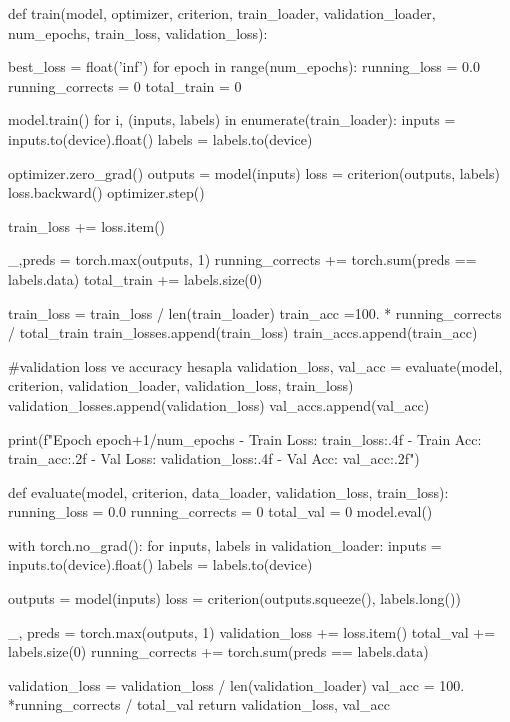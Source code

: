 \documentclass[11pt]{article}
\begin{document}
\begin{python}

def train(model, optimizer, criterion, train_loader, validation_loader, num_epochs, train_loss, validation_loss):
   
    best_loss = float('inf')
    for epoch in range(num_epochs):
        running_loss = 0.0
        running_corrects = 0
        total_train = 0


        model.train()
        for i, (inputs, labels) in enumerate(train_loader):
          inputs = inputs.to(device).float()
          labels = labels.to(device)
        
          optimizer.zero_grad()
          outputs = model(inputs)
          loss = criterion(outputs, labels)
          loss.backward()
          optimizer.step()

        
          train_loss += loss.item()

          _,preds = torch.max(outputs, 1)
          running_corrects += torch.sum(preds == labels.data)
          total_train += labels.size(0)

        train_loss = train_loss / len(train_loader)
        train_acc =100. * running_corrects / total_train
        train_losses.append(train_loss)
        train_accs.append(train_acc)

        #validation loss ve accuracy hesapla
        validation_loss, val_acc = evaluate(model, criterion, validation_loader, validation_loss, train_loss)
        validation_losses.append(validation_loss)
        val_accs.append(val_acc)
        
       

        print(f"Epoch {epoch+1}/{num_epochs} - Train Loss: {train_loss:.4f} - Train Acc: {train_acc:.2f} - Val Loss: {validation_loss:.4f} - Val Acc: {val_acc:.2f}")

        

\end{python}
\begin{python}

def evaluate(model, criterion, data_loader, validation_loss, train_loss):
    running_loss = 0.0
    running_corrects = 0
    total_val = 0  
    model.eval()
   

    with torch.no_grad():
        for inputs, labels in validation_loader:
            inputs = inputs.to(device).float()
            labels = labels.to(device)

            outputs = model(inputs)
            loss = criterion(outputs.squeeze(), labels.long())
            
            _, preds = torch.max(outputs, 1)
            validation_loss += loss.item()
            total_val += labels.size(0)
            running_corrects += torch.sum(preds == labels.data)

            
    validation_loss = validation_loss / len(validation_loader)
    val_acc = 100. *running_corrects / total_val
    return validation_loss, val_acc


\end{python}
\end{document}
